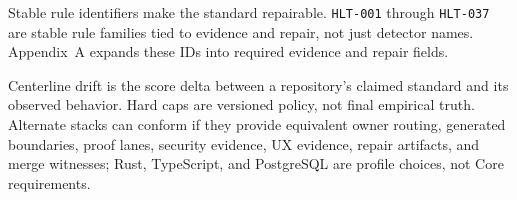 Stable rule identifiers make the standard repairable. \texttt{HLT-001} through \texttt{HLT-037} are stable rule families tied to evidence and repair, not just detector names. Appendix~A expands these IDs into required evidence and repair fields.

Centerline drift is the score delta between a repository's claimed standard and its observed behavior. Hard caps are versioned policy, not final empirical truth. Alternate stacks can conform if they provide equivalent owner routing, generated boundaries, proof lanes, security evidence, UX evidence, repair artifacts, and merge witnesses; Rust, TypeScript, and PostgreSQL are profile choices, not Core requirements.
